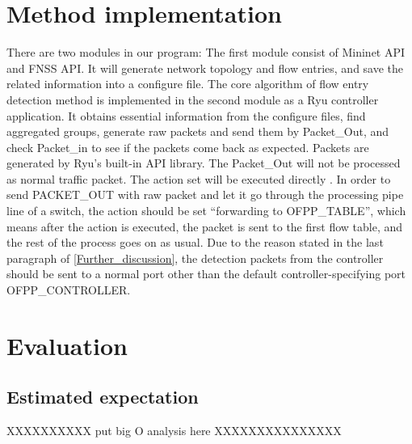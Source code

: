 \section{Method implementation} 
There are two modules in our program: The first module consist of Mininet API and FNSS API. It will generate network topology and flow entries, and save the related information into a configure file. The core algorithm of flow entry detection method is implemented in the second module as a Ryu controller application. It obtains essential information from the configure files, find aggregated groups, generate raw packets and send them by Packet\_Out, and check Packet\_in to see if the packets come back as expected. Packets are generated by Ryu's built-in API library. The Packet\_Out will not be processed as normal traffic packet. The action set will be executed directly \cite{PACKETOUT}. In order to send PACKET\_OUT with raw packet and let it go through the processing pipe line of a switch, the action should be set ``forwarding to OFPP\_TABLE'', which means after the action is executed, the packet is sent to the first flow table, and the rest of the process goes on as usual. Due to the reason stated in the last paragraph of \ref{Further_discussion}, the detection packets from the controller should be sent to a normal port other than the default controller-specifying port OFPP\_CONTROLLER. 



\section{}

\section{Evaluation}

\subsection{Estimated expectation}
XXXXXXXXXX put big O analysis here XXXXXXXXXXXXXXX
